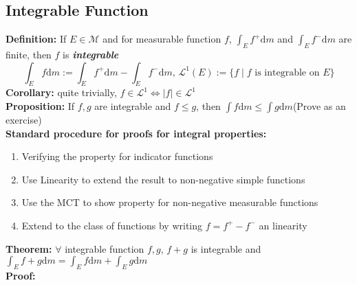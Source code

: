\documentclass{article}
\newcommand{\0}{{\bf{0}}}
\newcommand{\1}{{\bf{1}}}
\newcommand{\dint}{\displaystyle\int}
\newcommand{\dif}{\mbox{d}}
\begin{document}
\subsection{Integrable Function}
\textbf{Definition:} If $E\in\mathcal{M}$ and for measurable function $f$, $\dint_Ef^+\dif m$ and $\dint_Ef^-\dif m$ are finite, then $f$ is \textit{\textbf{integrable}}
$$\int_Ef\dif m:=\int_Ef^+\dif m-\int_Ef^-\dif m,\,\mathcal{L}^1(E):=\{f\mid f\mbox{ is integrable on }E\}$$
\textbf{Corollary:} quite trivially, $f\in\mathcal{L}^1\iff|f|\in\mathcal{L}^1$\\
\textbf{Proposition:} If $f,g$ are integrable and $f\le g$, then $\dint f\dif m\le\int g\dif m$\quad(Prove as an exercise)\\
\textbf{Standard procedure for proofs for integral properties:}
\begin{enumerate}
    \item Verifying the property for indicator functions
    \item Use Linearity to extend the result to non-negative simple functions
    \item Use the MCT to show property for non-negative measurable functions
    \item Extend to the class of functions by writing $f=f^+-f^-$ an linearity
\end{enumerate}
\textbf{Theorem:} $\forall$ integrable function $f,g$, $f+g$ is integrable and $\dint_Ef+g\dif m=\dint_Ef\dif m+\dint_Eg\dif m$\\
\textbf{Proof:}
\end{document}
